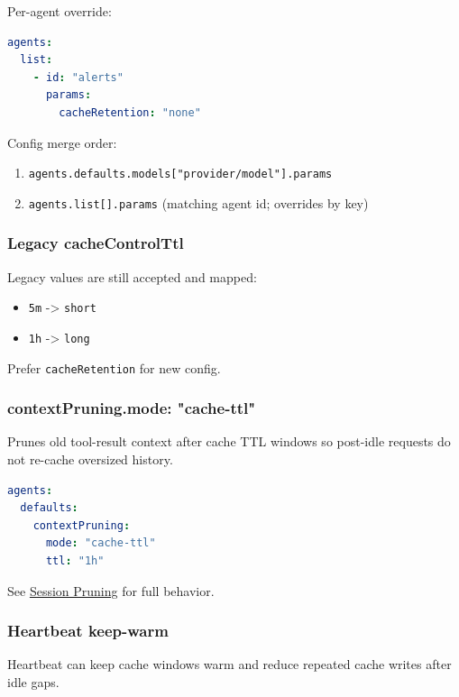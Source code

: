 Per-agent override:

\begin{lstlisting}[language=yaml]
agents:
  list:
    - id: "alerts"
      params:
        cacheRetention: "none"
\end{lstlisting}


Config merge order:

\begin{enumerate}
  \item \texttt{agents.defaults.models["provider/model"].params}
  \item \texttt{agents.list[].params} (matching agent id; overrides by key)
\end{enumerate}


\subsubsection{Legacy cacheControlTtl}


Legacy values are still accepted and mapped:

\begin{itemize}
  \item \texttt{5m} -> \texttt{short}
  \item \texttt{1h} -> \texttt{long}
\end{itemize}


Prefer \texttt{cacheRetention} for new config.

\subsubsection{contextPruning.mode: "cache-ttl"}


Prunes old tool-result context after cache TTL windows so post-idle requests do not re-cache oversized history.

\begin{lstlisting}[language=yaml]
agents:
  defaults:
    contextPruning:
      mode: "cache-ttl"
      ttl: "1h"
\end{lstlisting}


See \href{/concepts/session-pruning}{Session Pruning} for full behavior.

\subsubsection{Heartbeat keep-warm}


Heartbeat can keep cache windows warm and reduce repeated cache writes after idle gaps.

